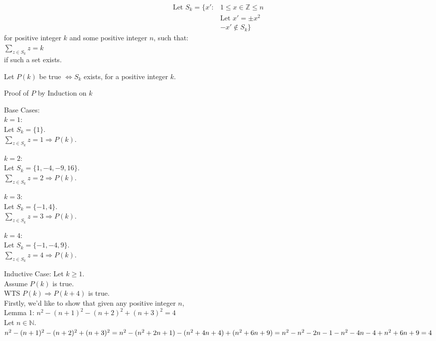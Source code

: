 \documentclass[fleqn]{article}
\begin{document}
\begin{align*}
  \text{Let } S_{k} = \lbrace x' : & 1 \leq x \in \mathbb{Z} \leq n \\
                                   & \text{Let } x' = \pm x^2 \\
                                   & -x' \not\in S_{k}
                      \rbrace
\end{align*}
for positive integer $k$ and some positive integer $n$, such that:\\
$\displaystyle\sum\limits_{z \in S_{k}} z = k$\\
if such a set exists.

Let $P(k)$ be true $\Leftrightarrow S_{k} $ exists, for a positive integer $k$.

Proof of $P$ by Induction on $k$

Base Cases:\\
$k = 1:$\\
Let $S_{k} = \lbrace 1 \rbrace$.\\
$\displaystyle\sum\limits_{z \in S_{k}} z = 1 \Rightarrow P(k)$.

$k = 2:$\\
Let $S_{k} = \lbrace 1,-4,-9,16 \rbrace$.\\
$\displaystyle\sum\limits_{z \in S_{k}} z = 2 \Rightarrow P(k)$.

$k = 3:$\\
Let $S_{k} = \lbrace-1,4\rbrace$.\\
$\displaystyle\sum\limits_{z \in S_{k}} z = 3 \Rightarrow P(k)$.

$k = 4:$\\
Let $S_{k} = \lbrace -1,-4,9 \rbrace$.\\
$\displaystyle\sum\limits_{z \in S_{k}} z = 4 \Rightarrow P(k)$.

Inductive Case: Let $k \geq 1$.\\
Assume $P(k)$ is true.\\
WTS $P(k) \Rightarrow P(k+4)$ is true.\\
Firstly, we'd like to show that given any positive integer $n$, \\
Lemma 1: $n^2 - (n+1)^2 - (n+2)^2 + (n+3)^2 = 4$\\
Let $n \in \mathbb{N}$.\\
$n^2 - (n+1) ^2 - (n+2)^2 + (n+3)^2 =\\
n^2 - (n^2 + 2n + 1) - (n^2 + 4n + 4) + (n^2 + 6n + 9) =\\
n^2 - n^2 - 2n - 1 - n^2 - 4n - 4 + n^2 + 6n + 9 = \\
4 $
\end{document}
